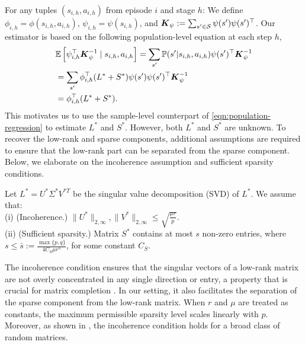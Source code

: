 For any tuples $(s_{i,h},a_{i,h})$ from episode $i$ and stage $h$: We define $\phi_{i,h}=\phi(s_{i,h},a_{i,h})$,  $\psi_{i,h}=\psi(s_{i,h})$, and $\boldsymbol{K}_{\psi} := \sum_{s'\in{\cal S}} \psi(s') \psi(s')^\top$. 
Our estimator is based on the following population-level equation at each step $h$, 
\begin{align} \label{eqn:population-regression}
&\mathbb{E}\left[ \psi_{i,h}^\top \boldsymbol{K}_{\psi}^{-1} \mid s_{i,h}, a_{i,h} \right] = \sum_{s'} \mathbb{P}(s' | s_{i,h}, a_{i,h}) \psi(s')^\top\boldsymbol{K}_{\psi}^{-1} \nonumber \\
& = \sum_{s'} \phi_{i,h}^\top ( L^* +  S^*) \psi(s') \psi(s')^\top\boldsymbol{K}_{\psi}^{-1} \nonumber \\
& =  \phi_{i,h}^\top ( L^* +  S^*).
\end{align}
This motivates us to use the sample-level counterpart of \eqref{eqn:population-regression} to estimate $L^*$ and  $S^*$. However, both $L^*$ and  $S^*$ are unknown. To recover the low-rank and sparse components, additional assumptions are required to ensure that the low-rank part can be separated from the sparse component. Below, we elaborate on the incoherence assumption and sufficient sparsity conditions.

\begin{assumption} \label{ass:low-rank-sparse}
Let \( L^* = U^* \Sigma^* V^{*T} \) be the singular value decomposition (SVD) of \( L^* \). 
We assume that:\\
(i) (Incoherence.) $\|U^*\|_{2,\infty},\|V^*\|_{2,\infty}\le \sqrt{\frac{\mu r}{p}}$.\\
(ii) (Sufficient sparsity.) Matrix $ S^*$ contains at most $s$ non-zero entries, where $s \leq \bar s:=\frac{\max\{p,q\}}{4C_S\mu r^3}$, for some constant $C_S$.
\end{assumption}

\begin{remark}  
The incoherence condition ensures that the singular vectors of a low-rank matrix are not overly concentrated in any single direction or entry, a property that is crucial for matrix completion \citep{candes2012exact}. In our setting, it also facilitates the separation of the sparse component from the low-rank matrix. When \( r \) and \( \mu \) are treated as constants, the maximum permissible sparsity level scales linearly with \( p \).  
Moreover, as shown in \citep{candes2010power}, the incoherence condition holds for a broad class of random matrices.  
\end{remark}

